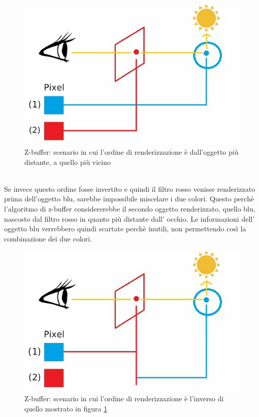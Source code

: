\begin{figure}[htb]
 \centering
 \includegraphics[width=0.8\linewidth]{images/chapter_stato_arte/stato_arte_zbuffer_1.jpg}\hfill
 \caption[Z-buffer: ordine di renderizzazione corretto]{Z-buffer: scenario in cui l'ordine di renderizzazione è dall'oggetto più distante, a quello più vicino}
 \label{fig:stato_arte_zbuffer_1}
\end{figure}
\\
Se invece questo ordine fosse invertito e quindi il filtro rosso venisse renderizzato prima dell’oggetto blu, sarebbe impossibile miscelare i due colori.
Questo perchè l’algoritmo di z-buffer considererebbe il secondo oggetto renderizzato, quello blu, nascosto dal filtro rosso in quanto più distante dall’ occhio. Le informazioni dell’ oggetto blu verrebbero quindi scartate perchè inutili, non permettendo così la combinazione dei due colori.
\\
\begin{figure}[htb]
 \centering
 \includegraphics[width=0.8\linewidth]{images/chapter_stato_arte/stato_arte_zbuffer_2.jpg}\hfill
 \caption[Z-buffer: ordine di renderizzazione errato]{Z-buffer: scenario in cui l'ordine di renderizzazione è l'inverso di quello mostrato in figura \ref{fig:stato_arte_zbuffer_1}}
 \label{fig:stato_arte_zbuffer_2}
\end{figure}

